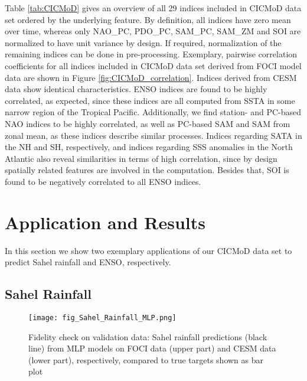 \documentclass{CUP-JNL-DTM}%
\theoremstyle{definition}
\numberwithin{equation}{section}
\begin{document}
Table \ref{tab:CICMoD} gives an overview of all 29 indices included in CICMoD data set ordered by the underlying feature. By definition, all indices have zero mean over time, whereas only NAO\_PC, PDO\_PC, SAM\_PC, SAM\_ZM and SOI are normalized to have unit variance by design. If required, normalization of the remaining indices can be done in pre-processing. Exemplary, pairwise correlation coefficients for all indices included in CICMoD data set derived from FOCI model data are shown in Figure \ref{fig:CICMoD_correlation}. Indices derived from CESM data show identical characteristics. ENSO indices are found to be highly correlated, as expected, since these indices are all computed from SSTA in some narrow region of the Tropical Pacific. Additionally, we find station- and PC-based NAO indices to be highly correlated, as well as PC-based SAM and SAM from zonal mean, as these indices describe similar processes. Indices regarding SATA in the NH and SH, respectively, and indices regarding SSS anomalies in the North Atlantic also reveal similarities in terms of high correlation, since by design spatially related features are involved in the computation. Besides that, SOI is found to be negatively correlated to all ENSO indices. 

\section{Application and Results \label{sec:Application_Results}}

In this section we show two exemplary applications of our CICMoD data set to predict Sahel rainfall and ENSO, respectively.

\subsection{Sahel Rainfall \label{subsec:SahelRainfall}}

\begin{figure}[!b]
\texttt{[image: fig\_Sahel\_Rainfall\_MLP.png]}
\caption{Fidelity check on validation data: Sahel rainfall predictions (black line) from MLP models on FOCI data (upper part) and CESM data (lower part), respectively, compared to true targets shown as bar plot}
\label{fig:Sahel_MLP}
\end{figure}
\end{document}
